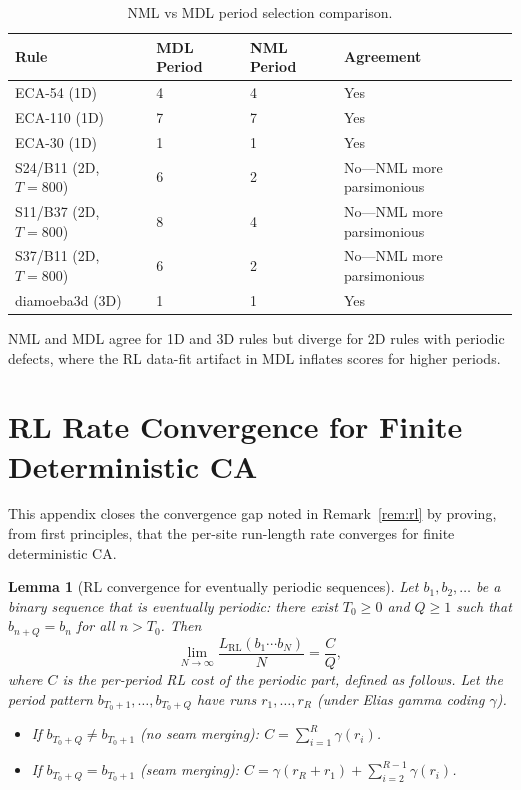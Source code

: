 \documentclass[11pt]{article}
\newtheorem{lemma}[theorem]{Lemma}
\theoremstyle{definition}
\theoremstyle{remark}
\newcommand{\RL}{\operatorname{RL}}
\begin{document}
\begin{table}[h]
\centering
\caption{NML vs MDL period selection comparison.}
\begin{tabular}{llll}
\toprule
Rule & MDL Period & NML Period & Agreement \\
\midrule
ECA-54 (1D)          & 4 & 4 & Yes \\
ECA-110 (1D)         & 7 & 7 & Yes \\
ECA-30 (1D)          & 1 & 1 & Yes \\
S24/B11 (2D, $T{=}800$) & 6 & 2 & No---NML more parsimonious \\
S11/B37 (2D, $T{=}800$) & 8 & 4 & No---NML more parsimonious \\
S37/B11 (2D, $T{=}800$) & 6 & 2 & No---NML more parsimonious \\
diamoeba3d (3D)      & 1 & 1 & Yes \\
\bottomrule
\end{tabular}
\end{table}

NML and MDL agree for 1D and 3D rules but diverge for 2D rules with periodic defects, where the RL data-fit artifact in MDL inflates scores for higher periods.

\section{RL Rate Convergence for Finite Deterministic CA}\label{app:rl}

This appendix closes the convergence gap noted in Remark~\ref{rem:rl} by proving, from first principles, that the per-site run-length rate converges for finite deterministic CA.

\begin{lemma}[RL convergence for eventually periodic sequences]\label{lem:rl-periodic}
Let $b_1, b_2, \ldots$ be a binary sequence that is eventually periodic: there exist $T_0 \geq 0$ and $Q \geq 1$ such that $b_{n+Q} = b_n$ for all $n > T_0$.
Then
\[
\lim_{N \to \infty} \frac{L_{\RL}(b_1 \cdots b_N)}{N} = \frac{C}{Q},
\]
where $C$ is the per-period RL cost of the periodic part, defined as follows.
Let the period pattern $b_{T_0+1}, \ldots, b_{T_0+Q}$ have runs $r_1, \ldots, r_R$ (under Elias gamma coding $\gamma$).
\begin{itemize}
    \item If $b_{T_0+Q} \neq b_{T_0+1}$ (no seam merging): $C = \sum_{i=1}^{R} \gamma(r_i)$.
    \item If $b_{T_0+Q} = b_{T_0+1}$ (seam merging): $C = \gamma(r_R + r_1) + \sum_{i=2}^{R-1} \gamma(r_i)$.
\end{itemize}
\end{lemma}
\end{document}
